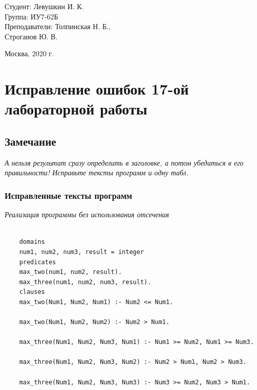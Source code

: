 \documentclass[a4paper,12pt]{article}
\begin{document}
	\vspace*{15mm} 	
	
	\large
	\begin{flushright}
		Студент: Левушкин И. К. \\
		Группа: ИУ7-62Б \\
		Преподаватели: Толпинская Н. Б., \\ Строганов Ю. В. \\
	\end{flushright}
	
	\vspace*{30mm}
	\begin{center}
		Москва, 2020 г.  
	\end{center}
	\thispagestyle{empty}
	
	
	\newpage

	\section*{Исправление ошибок 17-ой лабораторной работы}
	
	\subsection*{Замечание}
	
	\textit{А нельзя результат сразу определить в заголовке, а потом убедиться в его правильности! Исправьте тексты программ и одну табл.}
	
	\subsubsection*{Исправленные тексты программ}
	
	\textit{Реализация программы без использования отсечения}
	
	\begin{verbatim}
	
	domains
	num1, num2, num3, result = integer
	predicates
	max_two(num1, num2, result).
	max_three(num1, num2, num3, result).
	clauses
	max_two(Num1, Num2, Num1) :- Num2 <= Num1.
	
	max_two(Num1, Num2, Num2) :- Num2 > Num1.
	
	max_three(Num1, Num2, Num3, Num1) :- Num1 >= Num2, Num1 >= Num3.
	
	max_three(Num1, Num2, Num3, Num2) :- Num2 > Num1, Num2 > Num3.
	
	max_three(Num1, Num2, Num3, Num3) :- Num3 >= Num2, Num3 > Num1.
	\end{verbatim}
	
\end{document}
